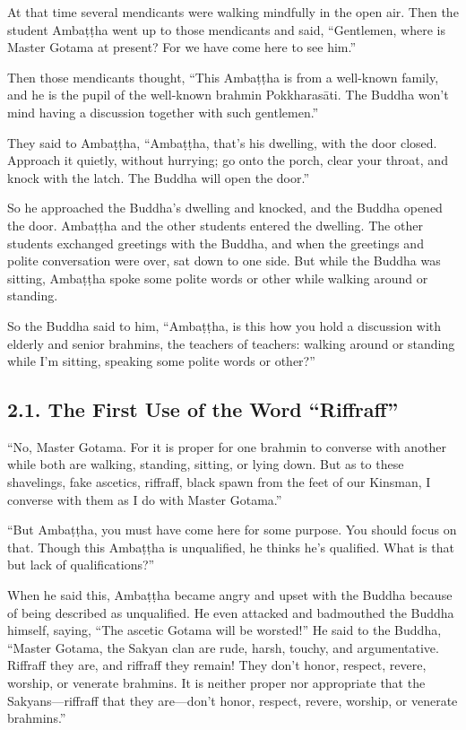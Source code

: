 \documentclass[12pt,openany]{book}%
\begin{document}
At that time several mendicants were walking mindfully in the open air. Then the student \textsanskrit{Ambaṭṭha} went up to those mendicants and said, “Gentlemen, where is Master Gotama at present? For we have come here to see him.” 

Then those mendicants thought, “This \textsanskrit{Ambaṭṭha} is from a well-known family, and he is the pupil of the well-known brahmin \textsanskrit{Pokkharasāti}. The Buddha won’t mind having a discussion together with such gentlemen.” 

They said to \textsanskrit{Ambaṭṭha}, “\textsanskrit{Ambaṭṭha}, that’s his dwelling, with the door closed. Approach it quietly, without hurrying; go onto the porch, clear your throat, and knock with the latch. The Buddha will open the door.” 

So he approached the Buddha’s dwelling and knocked, and the Buddha opened the door. \textsanskrit{Ambaṭṭha} and the other students entered the dwelling. The other students exchanged greetings with the Buddha, and when the greetings and polite conversation were over, sat down to one side. But while the Buddha was sitting, \textsanskrit{Ambaṭṭha} spoke some polite words or other while walking around or standing. 

So the Buddha said to him, “\textsanskrit{Ambaṭṭha}, is this how you hold a discussion with elderly and senior brahmins, the teachers of teachers: walking around or standing while I’m sitting, speaking some polite words or other?” 

\subsection*{2.1. The First Use of the Word “Riffraff” }

“No, Master Gotama. For it is proper for one brahmin to converse with another while both are walking, standing, sitting, or lying down. But as to these shavelings, fake ascetics, riffraff, black spawn from the feet of our Kinsman, I converse with them as I do with Master Gotama.” 

“But \textsanskrit{Ambaṭṭha}, you must have come here for some purpose. You should focus on that. Though this \textsanskrit{Ambaṭṭha} is unqualified, he thinks he’s qualified. What is that but lack of qualifications?” 

When he said this, \textsanskrit{Ambaṭṭha} became angry and upset with the Buddha because of being described as unqualified. He even attacked and badmouthed the Buddha himself, saying, “The ascetic Gotama will be worsted!” He said to the Buddha, “Master Gotama, the Sakyan clan are rude, harsh, touchy, and argumentative. Riffraff they are, and riffraff they remain! They don’t honor, respect, revere, worship, or venerate brahmins. It is neither proper nor appropriate that the Sakyans—riffraff that they are—don’t honor, respect, revere, worship, or venerate brahmins.” 
\end{document}
